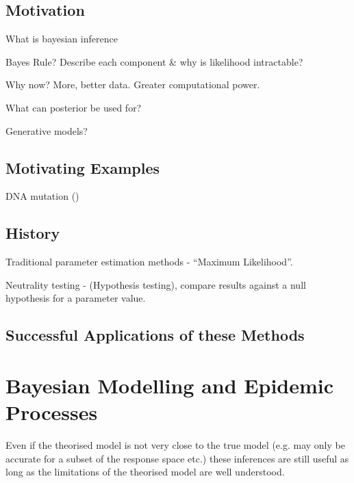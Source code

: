 \documentclass[11pt,a4paper]{article}
\theoremstyle{break}
\begin{document}
\subsection*{Motivation}\label{sec_motivation}

  \par What is bayesian inference
  \par Bayes Rule? Describe each component \& why is likelihood intractable?
  \par Why now? More, better data. Greater computational power.
  \par What can posterior be used for?
  \par Generative models?

\subsection*{Motivating Examples}\label{sec_motivating_examples}

  \par DNA mutation (\cite[]{modern_computational_approaches_for_analysing_molecular_genetic_variation_data})

\subsection*{History}\label{sec_history}

  \par Traditional parameter estimation methods - ``Maximum Likelihood''.
  \par Neutrality testing - (Hypothesis testing), compare results against a null hypothesis for a parameter value.

\subsection*{Successful Applications of these Methods}\label{sec_successful_applications}

\newpage
\section{Bayesian Modelling and Epidemic Processes}

  \par Even if the theorised model is not very close to the true model (e.g. may only be accurate for a subset of the response space etc.) these inferences are still useful as long as the limitations of the theorised model are well understood. %
\end{document}
